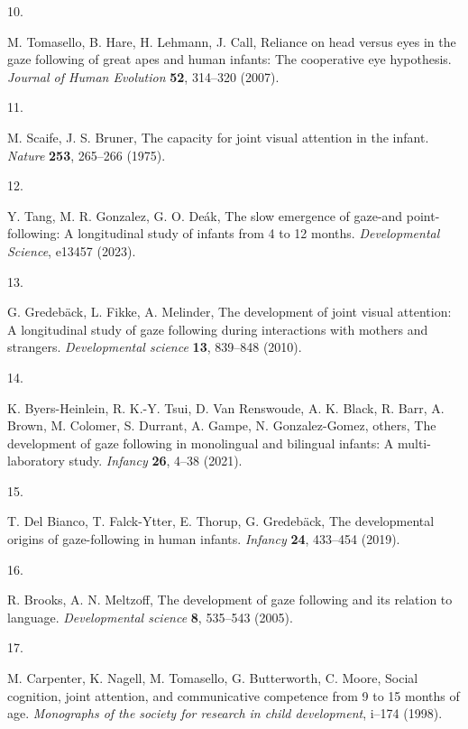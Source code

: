 \documentclass[
  man,floatsintext]{apa6}
\newlength{\cslhangindent}
\newlength{\csllabelwidth}
\newlength{\cslentryspacingunit} %
\newenvironment{CSLReferences}[2] %
 {%
  \setlength{\parindent}{0pt}
  \ifodd #1
  \let\oldpar\par
  \def\par{\hangindent=\cslhangindent\oldpar}
  \fi
  \setlength{\parskip}{#2\cslentryspacingunit}
 }%
 {}
\newcommand{\CSLLeftMargin}[1]{\parbox[t]{\csllabelwidth}{#1}}
\newcommand{\CSLRightInline}[1]{\parbox[t]{\linewidth - \csllabelwidth}{#1}\break}
\begin{document}
\begin{CSLReferences}{0}{0}
\leavevmode{}%
\CSLLeftMargin{10. }%
\CSLRightInline{M. Tomasello, B. Hare, H. Lehmann, J. Call, Reliance on head versus eyes in the gaze following of great apes and human infants: The cooperative eye hypothesis. \emph{Journal of Human Evolution} \textbf{52}, 314--320 (2007).}

\leavevmode{}%
\CSLLeftMargin{11. }%
\CSLRightInline{M. Scaife, J. S. Bruner, The capacity for joint visual attention in the infant. \emph{Nature} \textbf{253}, 265--266 (1975).}

\leavevmode{}%
\CSLLeftMargin{12. }%
\CSLRightInline{Y. Tang, M. R. Gonzalez, G. O. Deák, The slow emergence of gaze-and point-following: A longitudinal study of infants from 4 to 12 months. \emph{Developmental Science}, e13457 (2023).}

\leavevmode{}%
\CSLLeftMargin{13. }%
\CSLRightInline{G. Gredebäck, L. Fikke, A. Melinder, The development of joint visual attention: A longitudinal study of gaze following during interactions with mothers and strangers. \emph{Developmental science} \textbf{13}, 839--848 (2010).}

\leavevmode{}%
\CSLLeftMargin{14. }%
\CSLRightInline{K. Byers-Heinlein, R. K.-Y. Tsui, D. Van Renswoude, A. K. Black, R. Barr, A. Brown, M. Colomer, S. Durrant, A. Gampe, N. Gonzalez-Gomez, others, The development of gaze following in monolingual and bilingual infants: A multi-laboratory study. \emph{Infancy} \textbf{26}, 4--38 (2021).}

\leavevmode{}%
\CSLLeftMargin{15. }%
\CSLRightInline{T. Del Bianco, T. Falck-Ytter, E. Thorup, G. Gredebäck, The developmental origins of gaze-following in human infants. \emph{Infancy} \textbf{24}, 433--454 (2019).}

\leavevmode{}%
\CSLLeftMargin{16. }%
\CSLRightInline{R. Brooks, A. N. Meltzoff, The development of gaze following and its relation to language. \emph{Developmental science} \textbf{8}, 535--543 (2005).}

\leavevmode{}%
\CSLLeftMargin{17. }%
\CSLRightInline{M. Carpenter, K. Nagell, M. Tomasello, G. Butterworth, C. Moore, Social cognition, joint attention, and communicative competence from 9 to 15 months of age. \emph{Monographs of the society for research in child development}, i--174 (1998).}


\end{CSLReferences}
\end{document}
